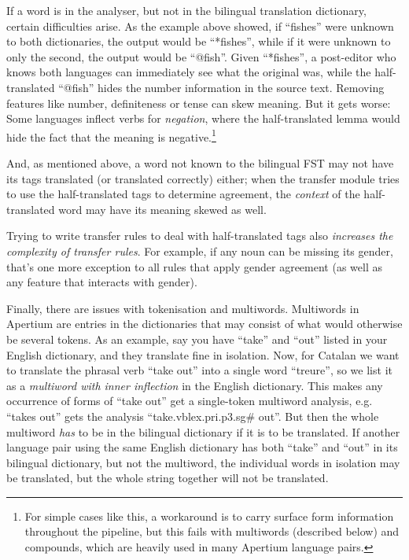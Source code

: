 \documentclass[10pt, a4paper]{article}
\begin{document}
If a word is in the analyser, but not in the bilingual translation
dictionary, certain difficulties arise. As the example above showed,
if ``fishes'' were unknown to both dictionaries, the output would be
``*fishes'', while if it were unknown to only the second, the output
would be ``@fish''. Given ``*fishes'', a post-editor who knows both
languages can immediately see what the original was, while the
half-translated ``@fish'' hides the number information in the source
text. Removing features like number, definiteness or tense can skew
meaning.  But it gets worse: Some languages inflect verbs for
\emph{negation}, where the half-translated lemma would hide the fact
that the meaning is negative.\footnote{For simple cases like this, a
    workaround is to carry surface form information throughout the
    pipeline, but this fails with multiwords (described below) and
    compounds, which are heavily used in many Apertium language
    pairs.}

And, as mentioned above, a word not known to the bilingual FST may not
have its tags translated (or translated correctly) either; when the
transfer module tries to use the half-translated tags to determine
agreement, the \emph{context} of the half-translated word may have its
meaning skewed as well.

Trying to write transfer rules to deal with half-translated tags also
\emph{increases the complexity of transfer rules}. For example, if any
noun can be missing its gender, that's one more exception to all rules
that apply gender agreement (as well as any feature that interacts with
gender).

Finally, there are issues with tokenisation and multiwords.
Multiwords in Apertium are entries in the dictionaries that may
consist of what would otherwise be several tokens. As an example, say
you have ``take'' and ``out'' listed in your English dictionary, and
they translate fine in isolation. Now, for Catalan we want to
translate the phrasal verb ``take out'' into a single word ``treure'',
so we list it as a \emph{multiword with inner inflection} in the
English dictionary. This makes any occurrence of forms of ``take out''
get a single-token multiword analysis, e.g. ``takes out'' gets the
analysis ``take.vblex.pri.p3.sg\# out''. But then the whole multiword
\emph{has} to be in the bilingual dictionary if it is to be
translated. If another language pair using the same English dictionary
has both ``take'' and ``out'' in its bilingual dictionary, but not the
multiword, the individual words in isolation may be translated, but
the whole string together will not be translated.
\end{document}
